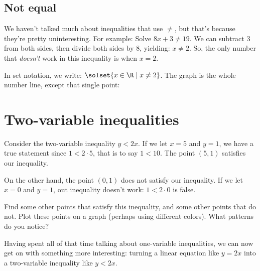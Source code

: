 \subsection{Not equal}

We haven't talked much about inequalities that use $\neq$, but that's because they're pretty uninteresting. For example: Solve $8x + 3 \neq 19$. We can subtract 3 from both sides, then divide both sides by 8, yielding: $x \neq 2$. So, the only number that \textit{doesn't} work in this inequality is when $x=2$.

In set notation, we write: $\solset{ x \in \R \mid x \neq 2}$. The graph is the whole number line, except that single point:
\begin{center}
\end{center}

\section{Two-variable inequalities}
\label{sec:ineqtwovar}

\begin{boxexplore}
Consider the two-variable inequality $y < 2x$. If we let $x=5$ and $y=1$, we have a true statement since $1 < 2\cdot5$, that is to say $1<10$. The point $(5,1)$ satisfies our inequality.

On the other hand, the point $(0,1)$ does not satisfy our inequality. If we let $x=0$ and $y=1$, out inequality doesn't work: $1<2\cdot0$ is false.

Find some other points that satisfy this inequality, and some other points that do not. Plot these points on a graph (perhaps using different colors). What patterns do you notice?
\end{boxexplore}

Having spent all of that time talking about one-variable inequalities, we can now get on with something more interesting: turning a linear equation like $y = 2x$ into a two-variable inequality like $y < 2x$.

